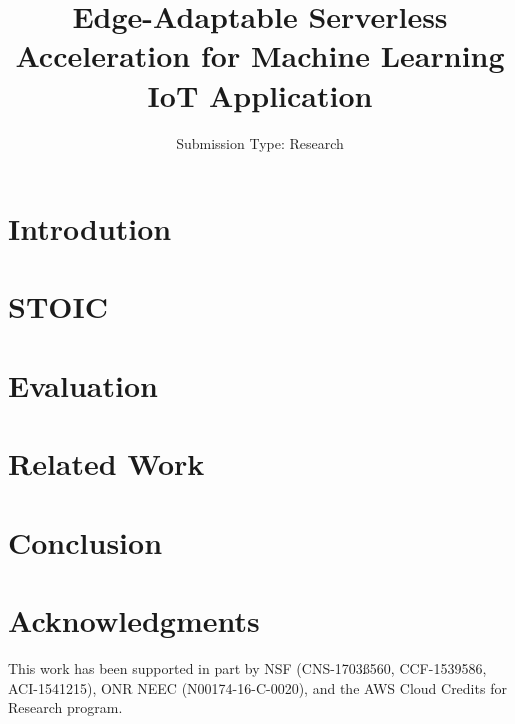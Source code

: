\documentclass[10pt,twocolumn]{article}
\begin{document}
\title{Edge-Adaptable Serverless Acceleration for Machine Learning IoT Application}
\author{
\small Submission Type: Research
}
\date{}
\maketitle

\begin{abstract}
\label{sec:abstract}

\end{abstract}

\section{Introdution}
\label{sec:intro}


\section{STOIC}
\label{sec:stoic}


\section{Evaluation}
\label{sec:results}


\section{Related Work}
\label{sec:related}



\section{Conclusion}
\label{sec:conc}


\section*{Acknowledgments}
This work has been supported in part by NSF (CNS-1703ß560, CCF-1539586,
ACI-1541215), ONR NEEC (N00174-16-C-0020),
and the AWS Cloud Credits for Research program.





\end{document}
